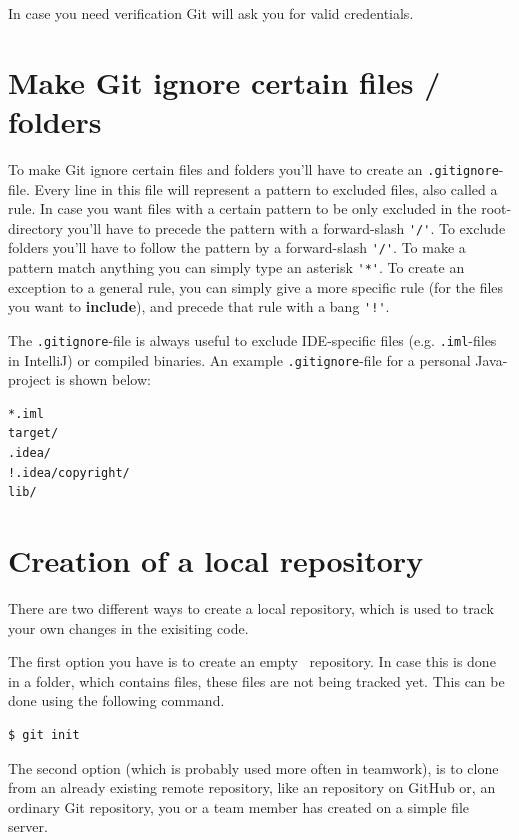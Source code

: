 \documentclass[a4paper, 12pt]{article}
\begin{document}
		In case you need verification Git will ask you for valid credentials.
				
	\section{Make Git ignore certain files / folders}
		
		To make Git ignore certain files and folders you'll have to create an \lstinline|.gitignore|-file. Every line in this file will represent a pattern to excluded files, also called a rule. In case you want files with a certain pattern to be only excluded in the root-directory you'll have to precede the pattern with a forward-slash \lstinline|'/'|. To exclude folders you'll have to follow the pattern by a forward-slash \lstinline|'/'|. To make a pattern match anything you can simply type an asterisk \lstinline|'*'|. To create an exception to a general rule, you can simply give a more specific rule (for the files you want to \textbf{include}), and precede that rule with a bang \lstinline|'!'|.
		
		The \lstinline|.gitignore|-file is always useful to exclude IDE-specific files (e.g. \lstinline|.iml|-files in IntelliJ) or compiled binaries. An example \lstinline|.gitignore|-file for a personal Java-project is shown below:
		
		\begin{lstlisting}
*.iml
target/
.idea/
!.idea/copyright/
lib/
		\end{lstlisting}

	\section{Creation of a local repository}

		There are two different ways to create a local repository, which is used to track your own changes in the exisiting code.

		The first option you have is to create an \glqq empty\grqq~ repository. In case this is done in a folder, which contains files, these files are not being tracked yet. This can be done using the following command.

		\begin{lstlisting}
$ git init
		\end{lstlisting}

		The second option (which is probably used more often in teamwork), is to clone from an already existing remote repository, like an repository on GitHub or, an ordinary Git repository, you or a team member has created on a simple file server.
\end{document}
